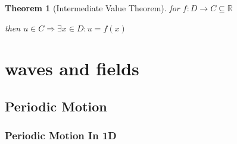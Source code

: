 \documentclass{article}
\newtheorem{theorem}{Theorem}
\begin{document}
\begin{theorem}[Intermediate Value Theorem]

    for \(f:D\rightarrow C\subseteq\mathbb{R}\)

    then \(u\in C\Rightarrow \exists x\in D: u=f(x)\)

\end{theorem} 


\newpage
\section{waves and fields}
\subsection{Periodic Motion}
\subsubsection*{Periodic Motion In 1D}
\end{document}
